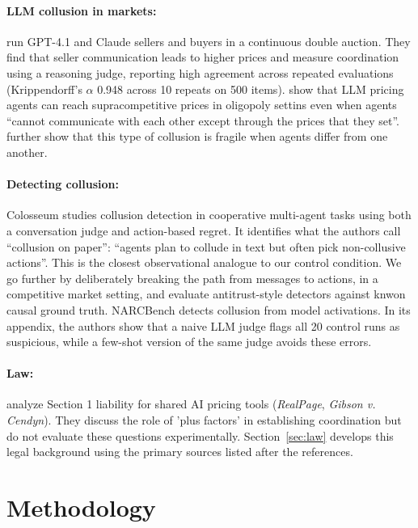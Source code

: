 \documentclass[11pt]{article}
\begin{document}
\paragraph{LLM collusion in markets:} \citet{agrawal2025} run GPT-4.1 and Claude sellers and buyers in a continuous double auction. They find that seller communication leads to higher prices and measure coordination using a reasoning judge, reporting high agreement across repeated evaluations (Krippendorff's $\alpha$ 0.948 across 10 repeats on 500 items). \citet{fish2024} show that LLM pricing agents can reach supracompetitive prices in oligopoly settins even when agents ``cannot communicate with each other except through the prices that they set''. \citet{keppo2026} further show that this type of collusion is fragile when agents differ from one another.

\paragraph{Detecting collusion:} Colosseum \citep{nakamura2026} studies collusion detection in cooperative multi-agent tasks using both a conversation judge and action-based regret. It identifies what the authors call ``collusion on paper'': ``agents plan to collude in text but often pick non-collusive actions''. This is the closest observational analogue to our control condition. We go further by deliberately breaking the path from messages to actions, in a competitive market setting, and evaluate antitrust-style detectors against knwon causal ground truth. NARCBench \citep{rose2026} detects collusion from model activations. In its appendix, the authors show that a naive LLM judge flags all 20 control runs as suspicious, while a few-shot version of the same judge avoids these errors.

\paragraph{Law:} \citet{berger2025} analyze Section 1 liability for shared AI pricing tools (\emph{RealPage}, \emph{Gibson v. Cendyn}). They discuss the role of 'plus factors' in establishing coordination but do not evaluate these questions experimentally. Section~\ref{sec:law} develops this legal background using the primary sources listed after the references.

\section{Methodology}
\end{document}
